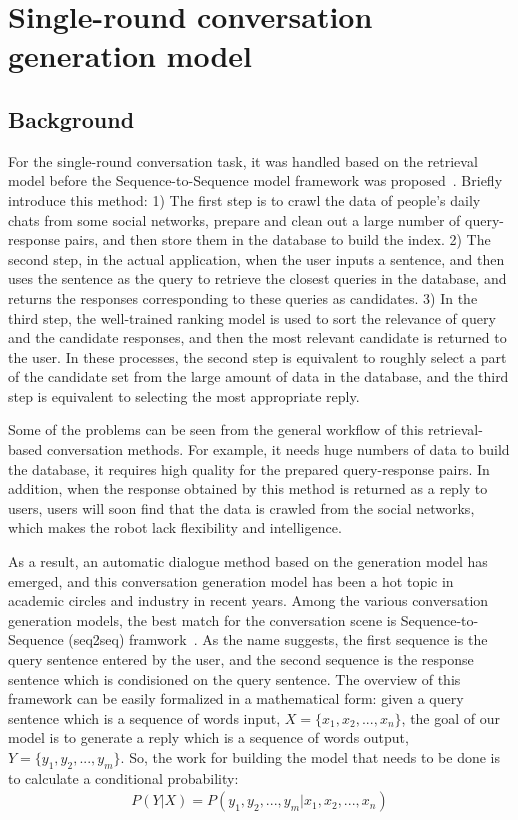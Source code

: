\documentclass[12pt,a4paper]{article}
\begin{document}
\section{Single-round conversation generation model}
\subsection{Background}

For the single-round conversation task, it was handled based on the retrieval model before the Sequence-to-Sequence model framework was proposed~\cite{DBLP:conf/sigir/YanSW16}. Briefly introduce this method: 1) The first step is to crawl the data of people's daily chats from some social networks, prepare and clean out a large number of query-response pairs, and then store them in the database to build the index. 2) The second step, in the actual application, when the user inputs a sentence, and then uses the sentence as the query to retrieve the closest queries in the database, and returns the responses corresponding to these queries as candidates. 3) In the third step, the well-trained ranking model is used to sort the relevance of query and the candidate responses, and then the most relevant candidate is returned to the user. In these processes, the second step is equivalent to roughly select a part of the candidate set from the large amount of data in the database, and the third step is equivalent to selecting the most appropriate reply.

Some of the problems can be seen from the general workflow of this retrieval-based conversation methods. For example, it needs huge numbers of data to build the database, it requires high quality for the prepared query-response pairs. In addition, when the response obtained by this method is returned as a reply to users, users will soon find that the data is crawled from the social networks, which makes the robot lack flexibility and intelligence.

As a result, an automatic dialogue method based on the generation model has emerged, and this conversation generation model has been a hot topic in academic circles and industry in recent years. Among the various conversation generation models, the best match for the conversation scene is Sequence-to-Sequence (seq2seq) framwork~\cite{DBLP:journals/corr/VinyalsL15,DBLP:journals/corr/WuSCLNMKCGMKSJL16}. As the name suggests, the first sequence is the query sentence entered by the user, and the second sequence is the response sentence which is condisioned on the query sentence. The overview of this framework can be easily formalized in a mathematical form: given a query sentence which is a sequence of words input, ${X=\{x_1, x_2, ..., x_n\}}$, the goal of our model is to generate a reply which is a sequence of words output, ${Y=\{y_1, y_2, ..., y_m\}}$. So, the work for building the model that needs to be done is to calculate a conditional probability:
\begin{gather*}
  P(Y|X) = P(y_1, y_2, ..., y_m|x_1, x_2, ..., x_n)
\end{gather*}
\end{document}
